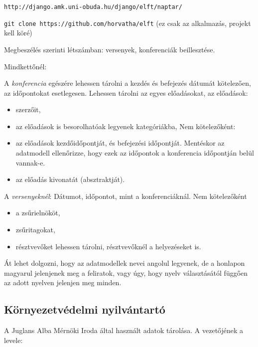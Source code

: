 \documentclass[a4paper]{article}
\begin{document}
\verb!http://django.amk.uni-obuda.hu/django/elft/naptar/!

\verb!git clone https://github.com/horvatha/elft!
(ez csak az alkalmazás, projekt kell köré)

Megbeszélés szerinti létszámban: versenyek, konferenciák beillesztése.

Mindkettőnél:

A \emph{konferencia} egészére lehessen tárolni a kezdés és befejezés dátumát
kötelezően, az időpontokat esetlegesen.
Lehessen tárolni az egyes előadásokat,
az előadások:
\begin{itemize}
    \item szerzőit,
    \item az előadások is besorolhatóak legyenek kategóriákba,
	Nem kötelezőként:
    \item az előadások kezdőidőpontját, és befejezési
	időpontját. Mentéskor az adatmodell ellenőrizze, hogy ezek az időpontok
	a konferencia időpontján belül vannak-e.
    \item az előadás kivonatát (absztraktját).
\end{itemize}

A \emph{versenyeknél}:
Dátumot, időpontot, mint a konferenciáknál.
Nem kötelezőként
\begin{itemize}
    \item a zsűrielnököt,
    \item zsűritagokat,
    \item résztvevőket lehessen tárolni, résztvevőknél a helyezéseket is.
\end{itemize}

Át lehet dolgozni, hogy az adatmodellek nevei angolul legyenek, de a
honlapon magyarul jelenjenek meg a feliratok, vagy úgy, hogy nyelv
választásától függően az adott nyelven jelenjen meg minden.

\subsection{Környezetvédelmi nyilvántartó}

A Juglans Alba Mérnöki Iroda által használt adatok tárolása. A
vezetőjének a levele:
\end{document}
